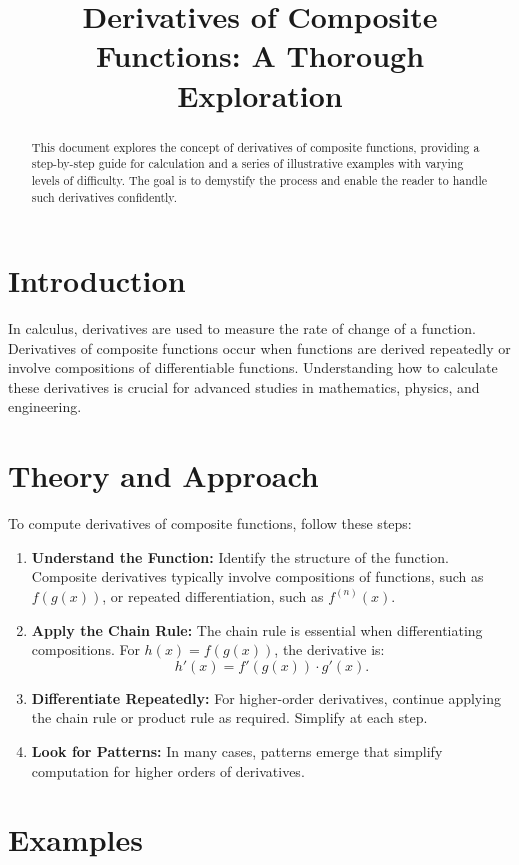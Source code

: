 \documentclass{article}
\title{Derivatives of Composite Functions: A Thorough Exploration}
\author{}
\date{}
\begin{document}
\maketitle

\begin{abstract}
This document explores the concept of derivatives of composite functions, providing a step-by-step guide for calculation and a series of illustrative examples with varying levels of difficulty. The goal is to demystify the process and enable the reader to handle such derivatives confidently.
\end{abstract}

\section{Introduction}
In calculus, derivatives are used to measure the rate of change of a function. Derivatives of composite functions occur when functions are derived repeatedly or involve compositions of differentiable functions. Understanding how to calculate these derivatives is crucial for advanced studies in mathematics, physics, and engineering.

\section{Theory and Approach}
To compute derivatives of composite functions, follow these steps:
\begin{enumerate}
    \item \textbf{Understand the Function:} Identify the structure of the function. Composite derivatives typically involve compositions of functions, such as $f(g(x))$, or repeated differentiation, such as $f^{(n)}(x)$.
    \item \textbf{Apply the Chain Rule:} The chain rule is essential when differentiating compositions. For $h(x) = f(g(x))$, the derivative is:
    \[
    h'(x) = f'(g(x)) \cdot g'(x).
    \]
    \item \textbf{Differentiate Repeatedly:} For higher-order derivatives, continue applying the chain rule or product rule as required. Simplify at each step.
    \item \textbf{Look for Patterns:} In many cases, patterns emerge that simplify computation for higher orders of derivatives.
\end{enumerate}

\section{Examples}
\end{document}
